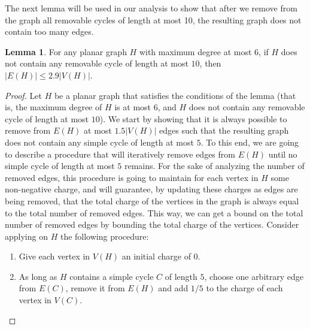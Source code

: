 \documentclass{article}
\theoremstyle{definition}
\newtheorem{lemma}{Lemma}[section]
\begin{document}
The next lemma will be used in our analysis to show that after we remove from the graph all removable cycles of length at most 10, the resulting graph does not contain too many edges.

\begin{lemma} For any planar graph $H$ with maximum degree at most $6$, if $H$ does not contain any removable cycle of length at most $10$, then $|E(H)| \le 2.9|V(H)|$.\label{lem:numberOfEdgesWithoutRemovableCycles}\end{lemma}

\begin{proof} Let $H$ be a planar graph that satisfies the conditions of the lemma (that is, the maximum degree of $H$ is at most $6$, and $H$ does not contain any removable cycle of length at most $10$). We start by showing that it is always possible to remove from $E(H)$ at most $1.5|V(H)|$ edges such that the resulting graph does not contain any simple cycle of length at most $5$. To this end, we are going to describe a procedure that will iteratively remove edges from $E(H)$ until no simple cycle of length at most $5$ remains. For the sake of analyzing the number of removed edges, this procedure is going to maintain for each vertex in $H$ some non-negative charge, and will guarantee, by updating these charges as edges are being removed, that the total charge of the vertices in the graph is always equal to the total number of removed edges. This way, we can get a bound on the total number of removed edges by bounding the total charge of the vertices.
Consider applying on $H$ the following procedure:
\begin{enumerate}
\item Give each vertex in $V(H)$ an initial charge of $0$.
	\item \label{proc:step2} As long as $H$ contains a simple cycle $C$ of length $5$, choose one arbitrary edge from $E(C)$, remove it from $E(H)$ and add $1/5$ to the charge of each vertex in $V(C)$.
	

\end{enumerate}
\end{proof}
\end{document}
